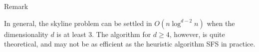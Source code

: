 \documentclass{beamer}
\begin{document}
\begin{frame}{Remark}
\begin{small}
    In general, the skyline problem can be settled in $O(n \log^{d-2} n)$ when the dimensionality $d$ is at least 3. The algorithm for $d \ge 4$, however, is quite theoretical, and may not be as efficient as the heuristic algorithm SFS in practice.
\end{small}
\end{frame}
\end{document}
